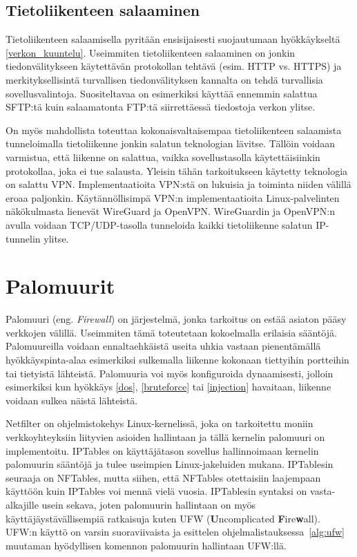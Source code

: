 \subsection{Tietoliikenteen salaaminen}\label{tietoliikenteen_salaaminen}

Tietoliikenteen salaamisella pyritään ensisijaisesti suojautumaan hyökkäykseltä \ref{verkon_kuuntelu}. Useimmiten tietoliikenteen salaaminen on jonkin tiedonvälitykseen käytettävän protokollan tehtävä (esim. HTTP vs. HTTPS) ja merkityksellisintä turvallisen tiedonvälityksen kannalta on tehdä turvallisia sovellusvalintoja. Suositeltavaa on esimerkiksi käyttää ennemmin salattua SFTP:tä kuin salaamatonta FTP:tä siirrettäessä tiedostoja verkon ylitse.

On myös mahdollista toteuttaa kokonaisvaltaisempaa tietoliikenteen salaamista tunneloimalla tietoliikenne jonkin salatun teknologian lävitse. Tällöin voidaan varmistua, että liikenne on salattua, vaikka sovellustasolla käytettäisiinkin protokollaa, joka ei tue salausta. Yleisin tähän tarkoitukseen käytetty teknologia on salattu VPN. Implementaatioita VPN:stä on lukuisia ja toiminta niiden välillä eroaa paljonkin. Käytännöllisimpä VPN:n implementaatioita Linux-palvelinten näkökulmasta lienevät WireGuard ja OpenVPN. WireGuardin ja OpenVPN:n avulla voidaan TCP/UDP-tasolla tunneloida kaikki tietoliikenne salatun IP-tunnelin ylitse.~\cite{ciampa2012security+}

\section{Palomuurit}\label{palomuurit}
Palomuuri (eng. \textit{Firewall}) on järjestelmä, jonka tarkoitus on estää asiaton pääsy verkkojen välillä. Useimmiten tämä toteutetaan kokoelmalla erilaisia sääntöjä. Palomuureilla voidaan ennaltaehkäistä useita uhkia vastaan pienentämällä hyökkäyspinta-alaa esimerkiksi sulkemalla liikenne kokonaan tiettyihin portteihin tai tietyistä lähteistä. Palomuuria voi myös konfiguroida dynaamisesti, jolloin esimerkiksi kun hyökkäys \ref{dos}, \ref{bruteforce} tai \ref{injection} havaitaan, liikenne voidaan sulkea näistä lähteistä.~\cite{ciampa2012security+}

Netfilter on ohjelmistokehys Linux-kernelissä, joka on tarkoitettu moniin verkkoyhteyksiin liityvien asioiden hallintaan ja tällä kernelin palomuuri on implementoitu. IPTables on käyttäjätason sovellus hallinnoimaan kernelin palomuurin sääntöjä ja tulee useimpien Linux-jakeluiden mukana. IPTablesin seuraaja on NFTables, mutta siihen, että NFTables otettaisiin laajempaan käyttöön kuin IPTables voi mennä vielä vuosia. IPTablesin syntaksi on vasta-alkajille usein sekava, joten palomuurin hallintaan on myös käyttäjäystävällisempiä ratkaisuja kuten UFW (\textbf{U}ncomplicated \textbf{F}ire\textbf{w}all). UFW:n käyttö on varsin suoraviivaista ja esittelen ohjelmalistauksessa~\ref{alg:ufw} muutaman hyödyllisen komennon palomuurin hallintaan UFW:llä.~\cite{binnie2016linux}~\cite{ufw}


